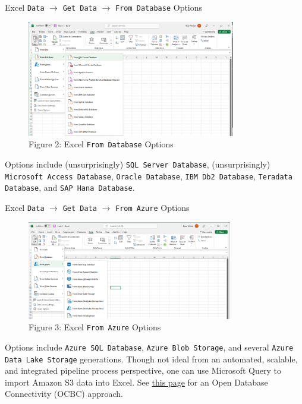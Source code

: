 \documentclass[pdf]{beamer}
\theoremstyle{remark}
\theoremstyle{definition}
\begin{document}
\begin{frame}[t]{Excel \texttt{Data} $\rightarrow$ \texttt{Get Data} $\rightarrow$ \texttt{From Database} Options}
\begin{figure}[htbp]
  \captionsetup{justification=centering}
  \includegraphics[height=2in, trim=0.0cm 0.0cm 0.0cm 0.0cm width=6in]{Images/Excel_2.png}
  \caption{Figure {\color{franklinblue} 2}: Excel \texttt{From Database} Options}
\end{figure}
\vspace{-1.5ex}
\small
Options include (unsurprisingly) \texttt{SQL Server Database}, (unsurprisingly) \texttt{Microsoft Access Database}, \texttt{Oracle Database}, \texttt{IBM Db2 Database}, \texttt{Teradata Database}, and \texttt{SAP Hana Database}. 
\end{frame}

\begin{frame}[t]{Excel \texttt{Data} $\rightarrow$ \texttt{Get Data} $\rightarrow$ \texttt{From Azure} Options}
\begin{figure}[htbp]
  \captionsetup{justification=centering}
  \includegraphics[height=1.7in, trim=0.0cm 0.0cm 0.0cm 0.0cm width=6in]{Images/Excel_3.png}
  \caption{Figure {\color{franklinblue} 3}: Excel \texttt{From Azure} Options}
\end{figure}
\vspace{-1.5ex}
\small
Options include \texttt{Azure SQL Database}, \texttt{Azure Blob Storage}, and several \texttt{Azure Data Lake Storage} generations.  Though not ideal from an automated, scalable, and integrated pipeline process perspective, one can use Microsoft Query to import Amazon S3 data into Excel. See \href{https://www.cdata.com/kb/tech/amazons3-odbc-excel-query.rst}{this page} for an Open Database Connectivity (OCBC) approach. 
\end{frame}
\end{document}
